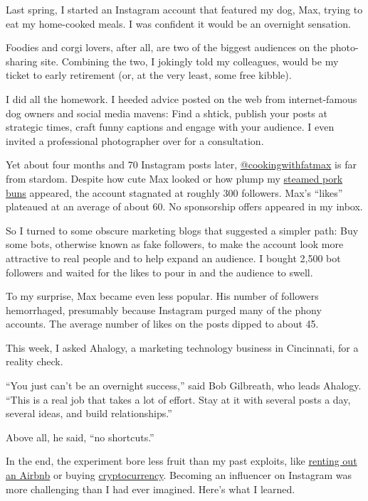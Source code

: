 Last spring, I started an Instagram account that featured my dog, Max,
trying to eat my home-cooked meals. I was confident it would be an
overnight sensation.

\begin{quote}
\end{quote}

Foodies and corgi lovers, after all, are two of the biggest audiences on
the photo-sharing site. Combining the two, I jokingly told my
colleagues, would be my ticket to early retirement (or, at the very
least, some free kibble).

I did all the homework. I heeded advice posted on the web from
internet-famous dog owners and social media mavens: Find a shtick,
publish your posts at strategic times, craft funny captions and engage
with your audience. I even invited a professional photographer over for
a consultation.

Yet about four months and 70 Instagram posts later,
\href{https://www.instagram.com/cookingwithfatmax/}{@cookingwithfatmax}
is far from stardom. Despite how cute Max looked or how plump my
\href{https://www.instagram.com/p/BoIGsugAUpt/}{steamed pork buns}
appeared, the account stagnated at roughly 300 followers. Max's
``likes'' plateaued at an average of about 60. No sponsorship offers
appeared in my inbox.

So I turned to some obscure marketing blogs that suggested a simpler
path: Buy some bots, otherwise known as fake followers, to make the
account look more attractive to real people and to help expand an
audience. I bought 2,500 bot followers and waited for the likes to pour
in and the audience to swell.

To my surprise, Max became even less popular. His number of followers
hemorrhaged, presumably because Instagram purged many of the phony
accounts. The average number of likes on the posts dipped to about 45.

This week, I asked Ahalogy, a marketing technology business in
Cincinnati, for a reality check.

``You just can't be an overnight success,'' said Bob Gilbreath, who
leads Ahalogy. ``This is a real job that takes a lot of effort. Stay at
it with several posts a day, several ideas, and build relationships.''

Above all, he said, ``no shortcuts.''

In the end, the experiment bore less fruit than my past exploits, like
\href{https://www.nytimes.com/2017/01/11/technology/personaltech/the-guide-to-being-an-airbnb-superhost.html}{renting
out an Airbnb} or buying
\href{https://www.nytimes.com/2018/08/20/technology/cryptocurrency-investor-losses.html}{cryptocurrency}.
Becoming an influencer on Instagram was more challenging than I had ever
imagined. Here's what I learned.

